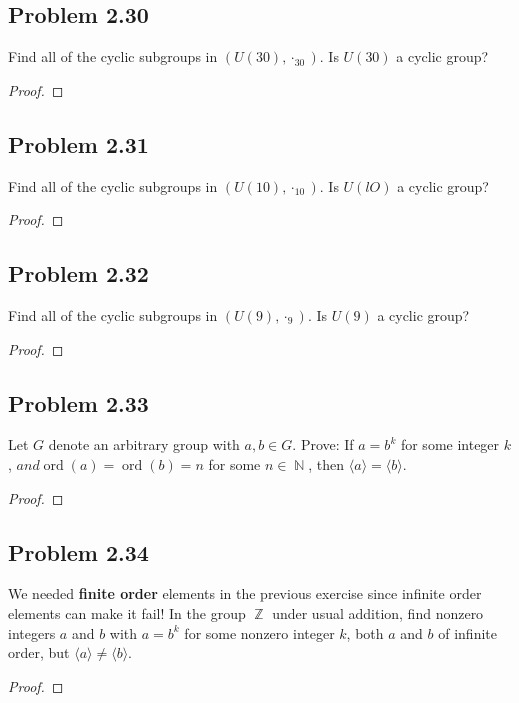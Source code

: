 \documentclass{amsbook}
\newcommand{\pid}[1]{\langle #1 \rangle}
\DeclareMathOperator{\ord}{\text{ord}}
\DeclareMathOperator{\N}{\mathbb{N}}
\DeclareMathOperator{\Z}{\mathbb{Z}}
\begin{document}
			\subsection*{Problem 2.30}
			\label{sub:problem_2_30}
			Find all of the cyclic subgroups in $(U(30), \cdot_{30})$.
			Is $U(30)$ a cyclic group?
			\begin{proof}
			\end{proof}

			\subsection*{Problem 2.31}
			\label{sub:problem_2_31}
			Find all of the cyclic subgroups in $(U(10), \cdot_{10})$.
			Is $U(lO)$ a cyclic group?
			\begin{proof}
			\end{proof}

			\subsection*{Problem 2.32}
			\label{sub:problem_2_32}
			Find all of the cyclic subgroups in $(U(9), \cdot_{9})$.
			Is $U(9)$ a cyclic group?
			\begin{proof}
			\end{proof}

			\subsection*{Problem 2.33}
			\label{sub:problem_2_33}
			Let $G$ denote an arbitrary group with $a,b \in G$. 
			Prove: If $a = b^{k}$ for some integer $k$, $and \ord(a) = \ord(b) = n$ for some $n \in \N$, then $\pid{a} = \pid{b}$.
			\begin{proof}
			\end{proof}

			\subsection*{Problem 2.34}
			\label{sub:problem_2_34}
			We needed \textbf{finite order} elements in the previous exercise since infinite order elements can make it fail! 
			In the group $\Z$ under usual addition, find nonzero integers $a$ and $b$ with $a = b^{k}$ for some nonzero integer $k$, both $a$ and $b$ of infinite order, but $\pid{a} \neq \pid{b}$.
			\begin{proof}
			\end{proof}
\end{document}
